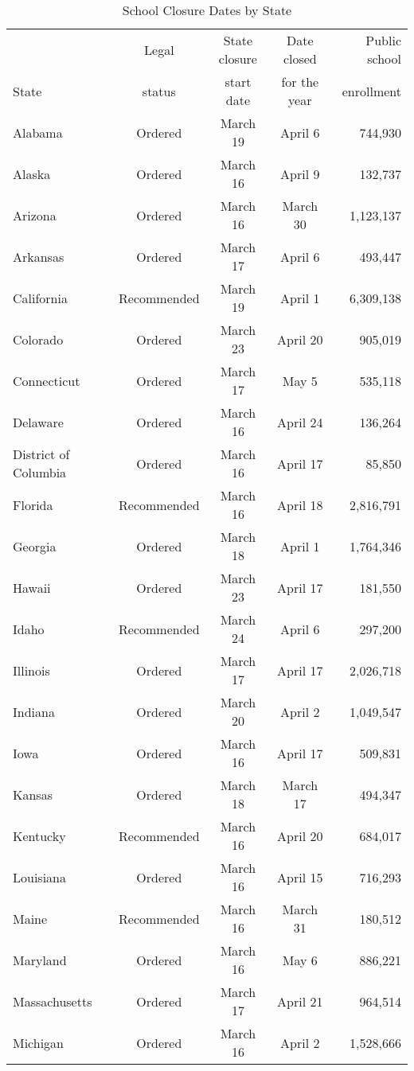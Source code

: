 \begin{table}[htbp] \centering
\scriptsize
\def\sym#1{\ifmmode^{#1}\else\(^{#1}\)\fi}
\caption{School Closure Dates by State}
\label{t_closures}
\begin{tabular*}{1\textwidth}{@{\extracolsep{\fill}}lcccr}
\midrule
		&	Legal	&	State closure 	&	Date closed 	&	Public school 	\\
State	&	status	&	start date		&	for the year	&	enrollment		\\
\midrule
Alabama	&	Ordered	&	March 19	&	April 6	&	744,930	\\
Alaska	&	Ordered	&	March 16	&	April 9	&	132,737	\\
Arizona	&	Ordered	&	March 16	&	March 30	&	1,123,137	\\
Arkansas	&	Ordered	&	March 17	&	April 6	&	493,447	\\
California	&	Recommended	&	March 19	&	April 1	&	6,309,138	\\
Colorado	&	Ordered	&	March 23	&	April 20	&	905,019	\\
Connecticut	&	Ordered	&	March 17	&	May 5	&	535,118	\\
Delaware	&	Ordered	&	March 16	&	April 24	&	136,264	\\
District of Columbia	&	Ordered	&	March 16	&	April 17	&	85,850	\\
Florida	&	Recommended	&	March 16	&	April 18	&	2,816,791	\\
Georgia	&	Ordered	&	March 18	&	April 1	&	1,764,346	\\
Hawaii	&	Ordered	&	March 23	&	April 17	&	181,550	\\
Idaho	&	Recommended	&	March 24	&	April 6	&	297,200	\\
Illinois	&	Ordered	&	March 17	&	April 17	&	2,026,718	\\
Indiana	&	Ordered	&	March 20	&	April 2	&	1,049,547	\\
Iowa	&	Ordered	&	March 16	&	April 17	&	509,831	\\
Kansas	&	Ordered	&	March 18	&	March 17	&	494,347	\\
Kentucky	&	Recommended	&	March 16	&	April 20	&	684,017	\\
Louisiana	&	Ordered	&	March 16	&	April 15	&	716,293	\\
Maine	&	Recommended	&	March 16	&	March 31	&	180,512	\\
Maryland	&	Ordered	&	March 16	&	May 6	&	886,221	\\
Massachusetts	&	Ordered	&	March 17	&	April 21	&	964,514	\\
Michigan	&	Ordered	&	March 16	&	April 2	&	1,528,666	\\

\end{tabular*}
\end{table}
